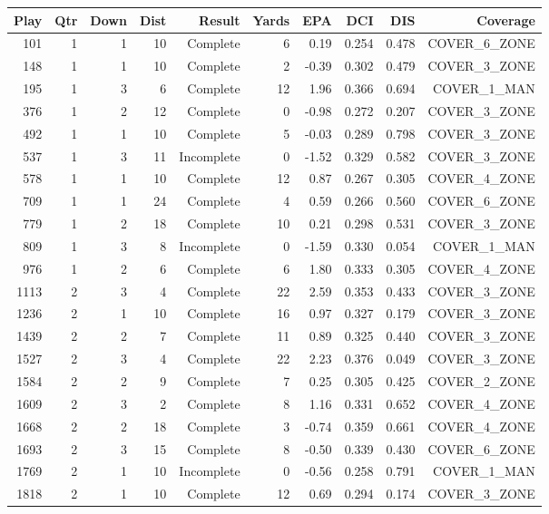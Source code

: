 \begin{tabular}{rrrrrrrrrr}
\toprule
Play & Qtr & Down & Dist & Result & Yards & EPA & DCI & DIS & Coverage \\
\midrule
101 & 1 & 1 & 10 & Complete & 6 & 0.19 & 0.254 & 0.478 & COVER\_6\_ZONE \\
148 & 1 & 1 & 10 & Complete & 2 & -0.39 & 0.302 & 0.479 & COVER\_3\_ZONE \\
195 & 1 & 3 & 6 & Complete & 12 & 1.96 & 0.366 & 0.694 & COVER\_1\_MAN \\
376 & 1 & 2 & 12 & Complete & 0 & -0.98 & 0.272 & 0.207 & COVER\_3\_ZONE \\
492 & 1 & 1 & 10 & Complete & 5 & -0.03 & 0.289 & 0.798 & COVER\_3\_ZONE \\
537 & 1 & 3 & 11 & Incomplete & 0 & -1.52 & 0.329 & 0.582 & COVER\_3\_ZONE \\
578 & 1 & 1 & 10 & Complete & 12 & 0.87 & 0.267 & 0.305 & COVER\_4\_ZONE \\
709 & 1 & 1 & 24 & Complete & 4 & 0.59 & 0.266 & 0.560 & COVER\_6\_ZONE \\
779 & 1 & 2 & 18 & Complete & 10 & 0.21 & 0.298 & 0.531 & COVER\_3\_ZONE \\
809 & 1 & 3 & 8 & Incomplete & 0 & -1.59 & 0.330 & 0.054 & COVER\_1\_MAN \\
976 & 1 & 2 & 6 & Complete & 6 & 1.80 & 0.333 & 0.305 & COVER\_4\_ZONE \\
1113 & 2 & 3 & 4 & Complete & 22 & 2.59 & 0.353 & 0.433 & COVER\_3\_ZONE \\
1236 & 2 & 1 & 10 & Complete & 16 & 0.97 & 0.327 & 0.179 & COVER\_3\_ZONE \\
1439 & 2 & 2 & 7 & Complete & 11 & 0.89 & 0.325 & 0.440 & COVER\_3\_ZONE \\
1527 & 2 & 3 & 4 & Complete & 22 & 2.23 & 0.376 & 0.049 & COVER\_3\_ZONE \\
1584 & 2 & 2 & 9 & Complete & 7 & 0.25 & 0.305 & 0.425 & COVER\_2\_ZONE \\
1609 & 2 & 3 & 2 & Complete & 8 & 1.16 & 0.331 & 0.652 & COVER\_4\_ZONE \\
1668 & 2 & 2 & 18 & Complete & 3 & -0.74 & 0.359 & 0.661 & COVER\_4\_ZONE \\
1693 & 2 & 3 & 15 & Complete & 8 & -0.50 & 0.339 & 0.430 & COVER\_6\_ZONE \\
1769 & 2 & 1 & 10 & Incomplete & 0 & -0.56 & 0.258 & 0.791 & COVER\_1\_MAN \\
1818 & 2 & 1 & 10 & Complete & 12 & 0.69 & 0.294 & 0.174 & COVER\_3\_ZONE \\

\end{tabular}
